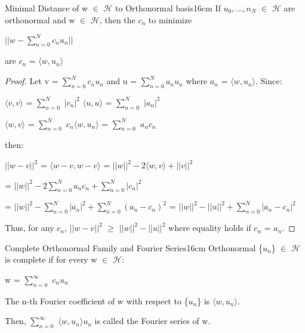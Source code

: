     \vspace{0.5cm}



    \begin{wtheorem}{Minimal Distance of w $\in$ $\mathcal{H}$
    to Orthonormal basis}{16cm}
        If $u_0,...,n_N$ $\in$ $\mathcal{H}$ are orthonormal
        and w $\in$ $\mathcal{H}$, then the $c_n$ to minimize

        \hspace{0.5cm}
        $|| w - \sum_{n=0}^N c_nu_n ||$

        are $c_n$ = $\langle w , u_n \rangle$
    \end{wtheorem}

    \begin{proof}
        Let v = $\sum_{n=0}^N c_nu_n$ and u = $\sum_{n=0}^N a_nu_n$
        where $a_n$ = $\langle w , u_n \rangle$. Since:

        \hspace{0.5cm}
        $\langle v , v \rangle$
        = $\sum_{n=0}^N$ $|c_n|^2$
        \hspace{1cm}
        $\langle u , u \rangle$
        = $\sum_{n=0}^N$ $|a_n|^2$

        \hspace{0.5cm}
        $\langle w , v \rangle$
        = $\sum_{n=0}^N$ $c_n \langle w , u_n \rangle$
        = $\sum_{n=0}^N$ $a_nc_n$

        then:

        \hspace{0.5cm}
        $||w-v||^2$
        = $\langle w-v , w-v \rangle$
        = $||w||^2 - 2 \langle w , v \rangle + ||v||^2$

        \hspace{2.3cm}
        = $||w||^2 - 2 \sum_{n=0}^N a_nc_n + \sum_{n=0}^N |c_n|^2$
        
        \hspace{2.3cm}
        = $||w||^2 - \sum_{n=0}^N |a_n|^2 + \sum_{n=0}^N (a_n-c_n)^2$
        = $||w||^2 - ||u||^2 + \sum_{n=0}^N |a_n-c_n|^2$

        Thus, for any $c_n$,
        $||w-v||^2$
        $\geq$ $||w||^2 - ||u||^2$
        where equality holds if $c_n$ = $a_n$.
    \end{proof}

    \vspace{0.5cm}



    \begin{definition}{Complete Orthonormal Family and Fourier Series}{16cm}
        Orthonormal \{$u_n$\} $\in$ $\mathcal{H}$ is {\color{lblue} complete}
        if for every w $\in$ $\mathcal{H}$:

        \hspace{0.5cm}
        w = $\sum_{n=0}^{\infty}$ $c_n u_n$

        The n-th Fourier coefficient of w with respect to \{$u_n$\}
        is $\langle w , u_n \rangle$.

        Then, $\sum_{n=0}^{\infty}$ $\langle w , u_n \rangle u_n$
        is called the {\color{lblue} Fourier series of w}.
    \end{definition}

